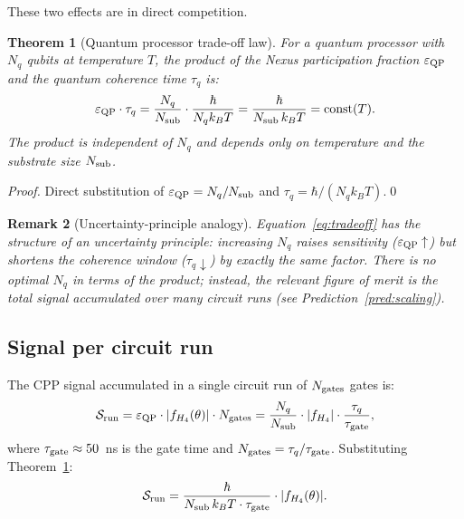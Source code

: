 \documentclass[11pt,letterpaper]{article}
\newtheorem{theorem}{Theorem}[section]
\newtheorem{remark}[theorem]{Remark}
\newcommand{\eps}{\varepsilon}
\begin{document}
These two effects are in direct competition.

\begin{theorem}[Quantum processor trade-off law]
\label{thm:tradeoff}
For a quantum processor with $N_q$ qubits at temperature $T$,
the product of the Nexus participation fraction $\eps_{\rm QP}$
and the quantum coherence time $\tau_q$ is:
\begin{equation}
\eps_{\rm QP} \cdot \tau_q
= \frac{N_q}{N_{\rm sub}} \cdot \frac{\hbar}{N_q k_B T}
= \frac{\hbar}{N_{\rm sub}\, k_B T}
= \mathrm{const}(T).
\label{eq:tradeoff}
\end{equation}
The product is independent of $N_q$ and depends only on temperature
and the substrate size $N_{\rm sub}$.
\end{theorem}

\begin{proof}
Direct substitution of $\eps_{\rm QP} = N_q/N_{\rm sub}$ and
$\tau_q = \hbar/(N_q k_B T)$.\qed
\end{proof}

\begin{remark}[Uncertainty-principle analogy]
Equation~\eqref{eq:tradeoff} has the structure of an uncertainty
principle: increasing $N_q$ raises sensitivity ($\eps_{\rm QP}
\uparrow$) but shortens the coherence window ($\tau_q \downarrow$)
by exactly the same factor.  There is no optimal $N_q$ in terms of
the product; instead, the relevant figure of merit is the total
signal accumulated over many circuit runs (see
Prediction~\ref{pred:scaling}).
\end{remark}

\subsection{Signal per circuit run}

The CPP signal accumulated in a single circuit run of $N_{\rm
gates}$ gates is:
\begin{equation}
\mathcal{S}_{\rm run}
= \eps_{\rm QP} \cdot |f_{H_4}(\theta)| \cdot N_{\rm gates}
= \frac{N_q}{N_{\rm sub}} \cdot |f_{H_4}|
  \cdot \frac{\tau_q}{\tau_{\rm gate}},
\label{eq:signal_run}
\end{equation}
where $\tau_{\rm gate} \approx 50$~ns is the gate time and
$N_{\rm gates} = \tau_q / \tau_{\rm gate}$.  Substituting
Theorem~\ref{thm:tradeoff}:
\begin{equation}
\mathcal{S}_{\rm run}
= \frac{\hbar}{N_{\rm sub}\, k_B T \cdot \tau_{\rm gate}}
  \cdot |f_{H_4}(\theta)|.
\label{eq:signal_independent}
\end{equation}
\end{document}
